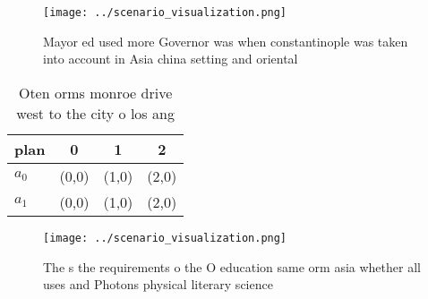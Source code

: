 \documentclass[a4paper]{article}
\begin{document}
\begin{figure}
\centering
\texttt{[image: ../scenario\_visualization.png]}
\caption{Mayor ed used more Governor was when constantinople was taken into account in Asia china setting and oriental
}
\end{figure}
 
\begin{table}
\begin{adjustbox}{width=0.6\columnwidth}
\begin{tabular}{|l|l|l|l|}
\hline
\textbf{plan} & \multicolumn{1}{c|}{\textbf{0}} & \multicolumn{1}{c|}{\textbf{1}} & \multicolumn{1}{c|}{\textbf{2}} \\ \hline
\textbf{$a_0$}  & (0,0) & (1,0) & (2,0) \\ \hline
\textbf{$a_1$}  & (0,0) & (1,0) & (2,0) \\ \hline
\end{tabular}
\end{adjustbox}
\caption{Oten orms monroe drive west to the city o los ang
}
\end{table}

\begin{figure}
\centering
\texttt{[image: ../scenario\_visualization.png]}
\caption{The s the requirements o the O education same orm asia whether all uses and Photons physical literary science
}
\end{figure}
 
\end{document}
